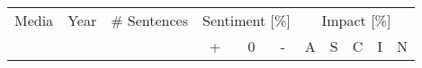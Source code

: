 

\begin{table*}[h]
\begin{center}
\begin{tabular} {@{}lcccccccccc@{}} 
\toprule
\multicolumn{1}{c}{Media} & \multicolumn{1}{c}{Year} & \multicolumn{1}{c}{\# Sentences} & \multicolumn{3}{c}{Sentiment [\%]} & \multicolumn{5}{c}{Impact [\%]} \\\cmidrule(lr){4-6} \cmidrule(l){7-11}
\multicolumn{1}{c}{} & \multicolumn{1}{c}{} & \multicolumn{1}{c}{} & \multicolumn{1}{c}{+} & \multicolumn{1}{c}{0} & \multicolumn{1}{c}{-} & \multicolumn{1}{c}{A} & \multicolumn{1}{c}{S} & \multicolumn{1}{c}{C} & \multicolumn{1}{c}{I} &  \multicolumn{1}{c}{N} \\\cmidrule(lr){1-3}\cmidrule(lr){4-6} \cmidrule(l){7-11}



\end{tabular}
\end{center}
\end{table*}

